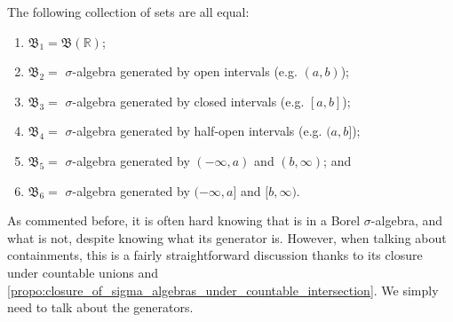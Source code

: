 \documentclass[notoc,notitlepage]{tufte-book}
\begin{document}
\begin{propo}\label{propo:other_formulations_of_the_borel_sigma_algebra}\label{propo:1.2}
  The following collection of sets are all equal:
  \begin{enumerate}
    \item $\mathfrak{B}_1 = \mathfrak{B}(\mathbb{R})$;
    \item $\mathfrak{B}_2 =$ $\sigma$-algebra generated by open intervals
      (e.g. $(a, b)$);
    \item $\mathfrak{B}_3 =$ $\sigma$-algebra generated by closed intervals
      (e.g. $[a, b]$);
    \item $\mathfrak{B}_4 =$ $\sigma$-algebra generated by half-open intervals
      (e.g. $(a, b]$);
    \item $\mathfrak{B}_5 =$ $\sigma$-algebra generated by $(-\infty, a)$
      and $(b, \infty)$; and
    \item $\mathfrak{B}_6 =$ $\sigma$-algebra generated by $(-\infty, a]$
      and $[b, \infty)$.
  \end{enumerate}
\end{propo}

As commented before, it is often hard knowing that is in
a Borel $\sigma$-algebra, and what is not, despite knowing
what its generator is.
However, when talking about containments, this is a fairly
straightforward discussion thanks to
its closure under countable unions and
\cref{propo:closure_of_sigma_algebras_under_countable_intersection}.
We simply need to talk about the generators.
\end{document}
